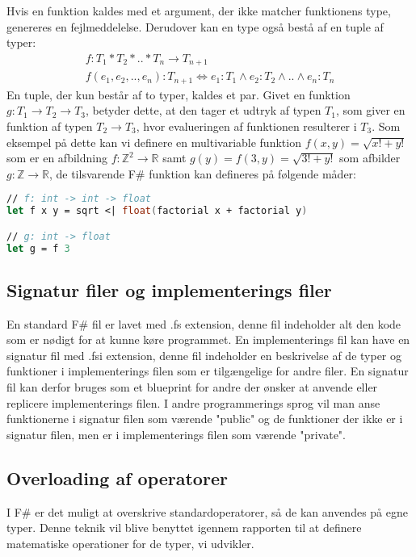 Hvis en funktion kaldes med et argument, der ikke matcher funktionens type, genereres en fejlmeddelelse. Derudover kan en type også bestå af en tuple af typer:
\begin{gather*}
    f: T_1 * T_2 * .. * T_n \rightarrow T_{n+1}\\
    f (e_1, e_2, .., e_n) :T_{n+1} \iff e_1 : T_1 \land e_2 : T_2 \land .. \land e_n : T_n
\end{gather*}
En tuple, der kun består af to typer, kaldes et par. Givet en funktion $g: T_1 \rightarrow T_2 \rightarrow T_3$, betyder dette, at den tager et udtryk af typen $T_1$, som giver en funktion af typen $T_2 \rightarrow T_3$, hvor evalueringen af funktionen resulterer i $T_3$. Som eksempel på dette kan vi definere en multivariable funktion $f(x, y) = \sqrt{x! + y!}$ som er en afbildning $f: \mathbb{Z}^2 \to \mathbb{R}$ samt $g(y) = f(3, y) = \sqrt{3! + y!}$ som afbilder $g: \mathbb{Z} \to \mathbb{R}$, de tilsvarende F\# funktion kan defineres på følgende måder:
\begin{lstlisting}[language={FSharp}, label={lst:multivariable_function}, caption={Eksempel typerne for en multivariable funktion i F\#}]
// f: int -> int -> float
let f x y = sqrt <| float(factorial x + factorial y)

// g: int -> float
let g = f 3
\end{lstlisting}





\subsection{Signatur filer og implementerings filer}
En standard F\# fil er lavet med .fs extension, denne fil indeholder alt den kode som er nødigt for at kunne køre programmet. En implementerings fil kan have en signatur fil med .fsi extension, denne fil indeholder en beskrivelse af de typer og funktioner i implementerings filen som er tilgængelige for andre filer. En signatur fil kan derfor bruges som et blueprint for andre der ønsker at anvende eller replicere implementerings filen. I andre programmerings sprog vil man anse funktionerne i signatur filen som værende "public" og de funktioner der ikke er i signatur filen, men er i implementerings filen som værende "private". 

\subsection{Overloading af operatorer}
I F\# er det muligt at overskrive standardoperatorer, så de kan anvendes på egne typer. Denne teknik vil blive benyttet igennem rapporten til at definere matematiske operationer for de typer, vi udvikler.


